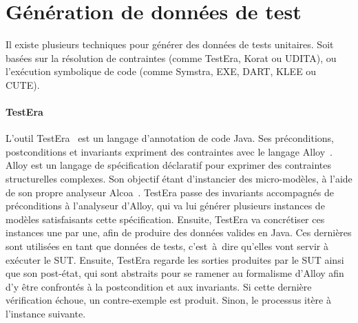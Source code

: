 
\section{Génération de données de test}

Il existe plusieurs techniques pour générer des données de tests unitaires. Soit
basées sur la résolution de contraintes (comme TestEra, Korat ou UDITA), ou
l'exécution symbolique de code (comme Symstra, EXE, DART, KLEE ou CUTE).

\paragraph{TestEra} L'outil TestEra~ est un langage
d'annotation de code Java. Ses préconditions, postconditions et invariants
expriment des contraintes avec le langage Alloy~. Alloy est un
langage de spécification déclaratif pour exprimer des contraintes structurelles
complexes. Son objectif étant d'instancier des micro-modèles, à l'aide de son
propre analyseur Alcoa~. TestEra passe des invariants
accompagnés de préconditions à l'analyseur d'Alloy, qui va lui générer plusieurs
instances de modèles satisfaisants cette spécification. Ensuite, TestEra va
concrétiser ces instances une par une, afin de produire des données valides en
Java. Ces dernières sont utilisées en tant que données de tests, c'est~à~dire
qu'elles vont servir à exécuter le SUT. Ensuite, TestEra regarde les sorties
produites par le SUT ainsi que son post-état, qui sont abstraits pour se ramener
au formalisme d'Alloy afin d'y être confrontés à la postcondition et aux
invariants. Si cette dernière vérification échoue, un contre-exemple est
produit. Sinon, le processus itère à l'instance suivante.

